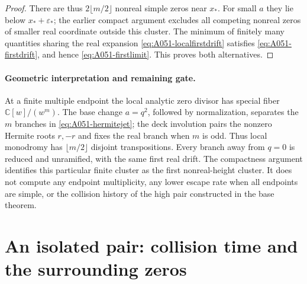 \begin{proof}
There are thus \(2\lfloor m/2\rfloor\) nonreal simple zeros
near \(x_*\). For small \(a\) they lie below
\(x_*+\varepsilon_*\); the earlier compact argument excludes
all competing nonreal zeros of smaller real coordinate outside
this cluster. The minimum of finitely many quantities sharing
the real expansion \eqref{eq:A051-localfirstdrift} satisfies
\eqref{eq:A051-firstdrift}, and hence
\eqref{eq:A051-firstlimit}. This proves both alternatives.
\end{proof}

\paragraph{Geometric interpretation and remaining gate.}
At a finite multiple endpoint the local analytic zero divisor
has special fiber \(\mathbb C[w]/(w^m)\).
The base change \(a=q^2\), followed by normalization, separates
the \(m\) branches in \eqref{eq:A051-hermitejet}; the deck
involution pairs the nonzero Hermite roots \(r,-r\) and fixes
the real branch when \(m\) is odd. Thus local monodromy has
\(\lfloor m/2\rfloor\) disjoint transpositions. Every branch
away from \(q=0\) is reduced and unramified, with the same
first real drift. The compactness argument identifies this
particular finite cluster as the first nonreal-height cluster.
It does not compute any endpoint multiplicity, any lower escape
rate when all endpoints are simple, or the collision history of
the high pair constructed in the base theorem.


\section{An isolated pair: collision time and the surrounding zeros}
\label{sec:analytic-isolated-collision}


